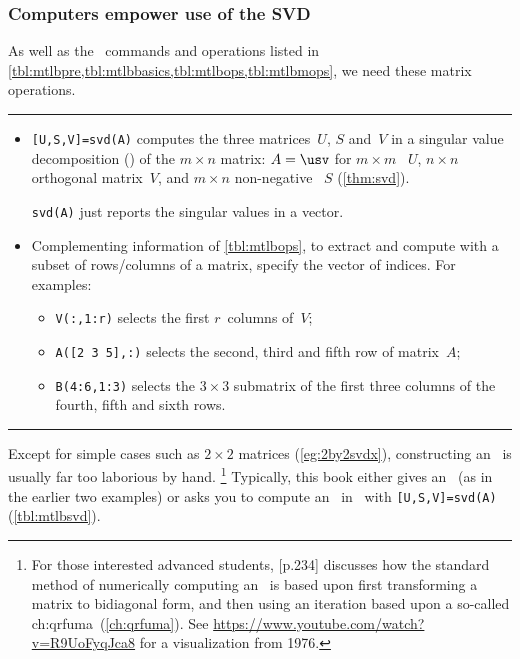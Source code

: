 \subsubsection{Computers empower use of the SVD}

\begin{table}
\caption{As well as the \script\ commands and operations listed in \cref{tbl:mtlbpre,tbl:mtlbbasics,tbl:mtlbops,tbl:mtlbmops},  we need these matrix operations.} \label{tbl:mtlbsvd}
\hrule
\begin{minipage}{\linewidth}
\begin{itemize}
\item {}\verb|[U,S,V]=svd(A)| computes the three matrices~\(U\), \(S\) and~\(V\) in a singular value decomposition (\svd) of the \(m\times n\) matrix: \(A=\usv\) for \(m\times m\) ~\(U\), \(n\times n\) orthogonal matrix~\(V\), and \(m\times n\) non-negative ~\(S\) (\cref{thm:svd}).

\verb|svd(A)| just reports the singular values in a vector.

\item Complementing information of \cref{tbl:mtlbops}, to extract and compute with a subset of rows\slash columns of a matrix, specify the vector of indices.
For examples:
\begin{itemize}
\item \verb|V(:,1:r)| selects the first \(r\)~columns of~\(V\);
\item \verb|A([2 3 5],:)| selects the second, third and fifth row of matrix~\(A\);
\item \verb|B(4:6,1:3)| selects the \(3\times 3\) submatrix of the first three columns of the fourth, fifth and sixth rows.
\end{itemize}

\end{itemize}
\end{minipage}
\hrule
\end{table}




Except for simple cases such as \(2\times 2\) matrices (\cref{eg:2by2svdx}), constructing an \svd\ is usually far too laborious by hand.%
\footnote{For those interested advanced students, \cite{Trefethen1997} [p.234] discusses how the standard method of numerically computing an \svd\ is based upon first transforming a matrix to bidiagonal form, and then using an iteration based upon a so-called \ifcsname ch:qrfuma\endcsname\ (\cref{ch:qrfuma})\fi.
See \url{https://www.youtube.com/watch?v=R9UoFyqJca8} for a visualization from 1976.}
Typically, this book either gives an \svd\ (as in the earlier two examples) or asks you to compute an \svd\ in \script\ with \verb|[U,S,V]=svd(A)| (\cref{tbl:mtlbsvd}).

